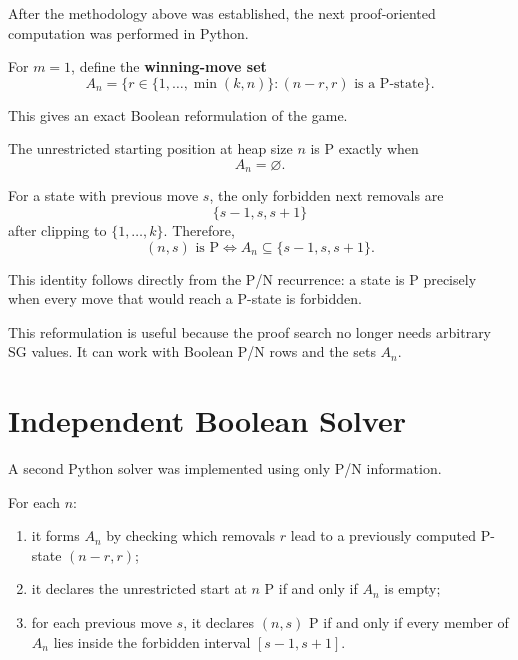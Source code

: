 \documentclass[11pt]{article}
\begin{document}
After the methodology above was established, the next proof-oriented computation was performed in Python.

For $m=1$, define the \textbf{winning-move set}
\begin{equation}
    A_n=\{r\in\{1,\ldots,\min(k,n)\}:(n-r,r)\text{ is a P-state}\}.
\end{equation}

This gives an exact Boolean reformulation of the game.

The unrestricted starting position at heap size $n$ is P exactly when
\begin{equation}
\boxed{A_n=\varnothing.}
\end{equation}

For a state with previous move $s$, the only forbidden next removals are
\begin{equation}
    \{s-1,s,s+1\}
\end{equation}
after clipping to $\{1,\ldots,k\}$. Therefore,
\begin{equation}
\boxed{
    (n,s)\text{ is P}
    \iff
    A_n\subseteq\{s-1,s,s+1\}.
}
\end{equation}

This identity follows directly from the P/N recurrence: a state is P precisely when every move that would reach a P-state is forbidden.

This reformulation is useful because the proof search no longer needs arbitrary SG values. It can work with Boolean P/N rows and the sets $A_n$.

\section{Independent Boolean Solver}

A second Python solver was implemented using only P/N information.

For each $n$:
\begin{enumerate}
    \item it forms $A_n$ by checking which removals $r$ lead to a previously computed P-state $(n-r,r)$;
    \item it declares the unrestricted start at $n$ P if and only if $A_n$ is empty;
    \item for each previous move $s$, it declares $(n,s)$ P if and only if every member of $A_n$ lies inside the forbidden interval $[s-1,s+1]$.
\end{enumerate}
\end{document}

